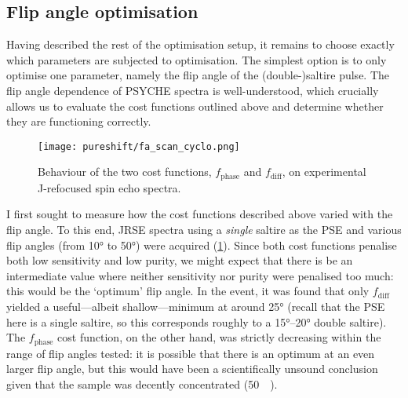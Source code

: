 \subsection{Flip angle optimisation}
\label{subsec:pureshift__faopt}

Having described the rest of the optimisation setup, it remains to choose exactly which parameters are subjected to optimisation.
The simplest option is to only optimise one parameter, namely the flip angle of the (double-)saltire pulse.
The flip angle dependence of PSYCHE spectra is well-understood, which crucially allows us to evaluate the cost functions outlined above and determine whether they are functioning correctly.

\begin{figure}[htb]
    \centering
    \texttt{[image: pureshift/fa\_scan\_cyclo.png]}%
    \caption[Behaviour of $f_\text{phase}$ and $f_\text{diff}$ on experimental J-refocused spin echo spectra.]{
        Behaviour of the two cost functions, $f_\text{phase}$ and $f_\text{diff}$, on experimental J-refocused spin echo spectra.
    }
    \label{fig:fa_scan_cyclo}
\end{figure}

I first sought to measure how the cost functions described above varied with the flip angle.
To this end, JRSE spectra using a \textit{single} saltire as the PSE and various flip angles (from \ang{10} to \ang{50}) were acquired (\cref{fig:fa_scan_cyclo}).
Since both cost functions penalise both low sensitivity and low purity, we might expect that there is be an intermediate value where neither sensitivity nor purity were penalised too much: this would be the `optimum' flip angle.
In the event, it was found that only $f_\text{diff}$ yielded a useful---albeit shallow---minimum at around \ang{25} (recall that the PSE here is a single saltire, so this corresponds roughly to a \ang{15}--\ang{20} double saltire).
The $f_\text{phase}$ cost function, on the other hand, was strictly decreasing within the range of flip angles tested: it is possible that there is an optimum at an even larger flip angle, but this would have been a scientifically unsound conclusion given that the sample was decently concentrated (\qty{50}{\milli\molar}).


